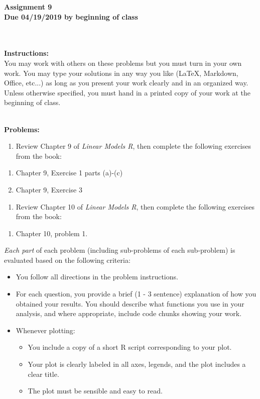 \documentclass[11pt,a4paper]{article}
\begin{document}
\begin{center}
{\huge\textbf{Assignment 9
\\\vspace{5mm} Due 04/19/2019 by beginning of class }} \\
\hfill\\
\end{center}
\hfill\\
\noindent
{\large \textbf{Instructions:}}\\
You may work with others on these problems but you must turn in your own work.  You may type your solutions in any way you like (LaTeX, Markdown, Office, etc...) as long as you present your work clearly and in an organized way.\\

\noindent
Unless otherwise specified, you must hand in a printed copy of your work at the beginning of class.

\hfill\\
\noindent
{\large \textbf{Problems:}}\\
\begin{enumerate}[{1}]
	\item Review Chapter 9 of \emph{Linear Models R}, then complete the following exercises from the book:
\end{enumerate}
\begin{enumerate}[{1}.1]
	\item Chapter 9, Exercise 1 parts (a)-(c)
	\item Chapter 9, Exercise 3
\end{enumerate}
\begin{enumerate}[{2}]
	\item Review Chapter 10 of \emph{Linear Models R}, then complete the following exercises from the book:
\end{enumerate}
\begin{enumerate}[{2}.1]
	\item Chapter 10, problem 1.
\end{enumerate}
\emph{Each part} of each problem (including sub-problems of each sub-problem) is evaluated based on the following criteria:
	\begin{itemize}
		\item You follow all directions in the problem instructions.
		\item For each question, you provide a brief (1 - 3 sentence) explanation of how you obtained your results.	 You should describe what functions you use in your analysis, and where appropriate, include code chunks showing your work.	
		\item Whenever plotting:
		\begin{itemize}
		\item You include a copy of a short R script corresponding to your plot.
		\item Your plot is clearly labeled in all axes, legends, and the plot includes a clear title.  
		\item The plot must be sensible and easy to read.
		\end{itemize}
	\end{itemize}
\end{document}
